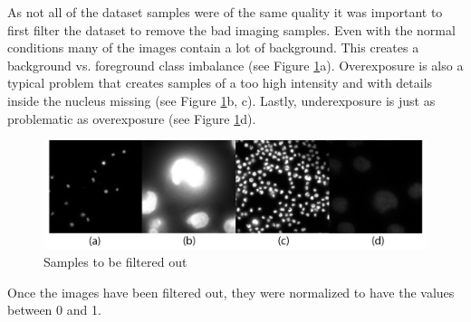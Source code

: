 As not all of the dataset samples were of the same quality it was important to first filter the dataset to remove the bad imaging samples. Even with the normal conditions many of the images contain a lot of background. This creates a background vs. foreground class imbalance (see Figure \ref{fig:bad-smaples}a). Overexposure is also a typical problem that creates samples of a too high intensity and with details inside the nucleus missing (see Figure \ref{fig:bad-smaples}b, c). Lastly, underexposure is just as problematic as overexposure (see Figure \ref{fig:bad-smaples}d).

\begin{figure}[H]
	\begin{center}
		\includegraphics[width=0.6\linewidth]{bilder/nuclei/filter-out.png}
		\caption{Samples to be filtered out}\label{fig:bad-smaples}
	\end{center}
\end{figure}

Once the images have been filtered out, they were normalized to have the values between 0 and 1.
